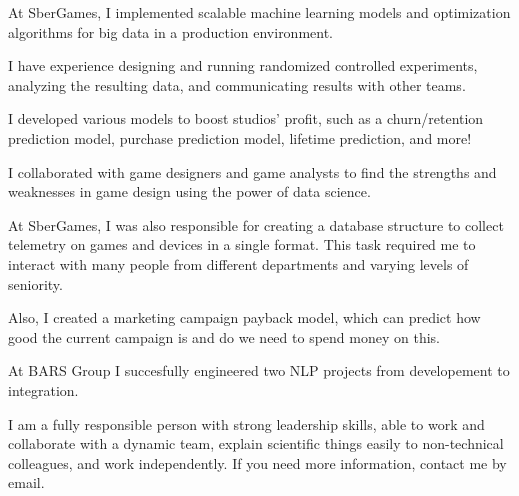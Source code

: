 \documentclass[11pt, a4paper]{awesome-cv}
\begin{document}
\begin{cvletter}
\begin{cvitems}
  \item {At SberGames, I implemented scalable machine learning models and optimization algorithms for big data in a production environment.}
  \item {I have experience designing and running randomized controlled experiments, analyzing the resulting data, and communicating results with other teams.}
  \item {I developed various models to boost studios' profit, such as a churn/retention prediction model, purchase prediction model, lifetime prediction, and more!}
  \item {I collaborated with game designers and game analysts to find the strengths and weaknesses in game design using the power of data science.}
  \item {At SberGames, I was also responsible for creating a database structure to collect telemetry on games and devices in a single format. This task required me to interact with many people from different departments and varying levels of seniority.}
  \item {Also, I created a marketing campaign payback model, which can predict how good the current campaign is and do we need to spend money on this.}
  \item {At BARS Group I succesfully engineered two NLP projects from developement to integration.}
  
\end{cvitems}
\bigskip


I am a fully responsible person with strong leadership skills, able to work and collaborate with a dynamic team, explain scientific things easily to non-technical colleagues, and work independently. If you need more information, contact me by email.

\end{cvletter}


\makeletterclosing
\end{document}
